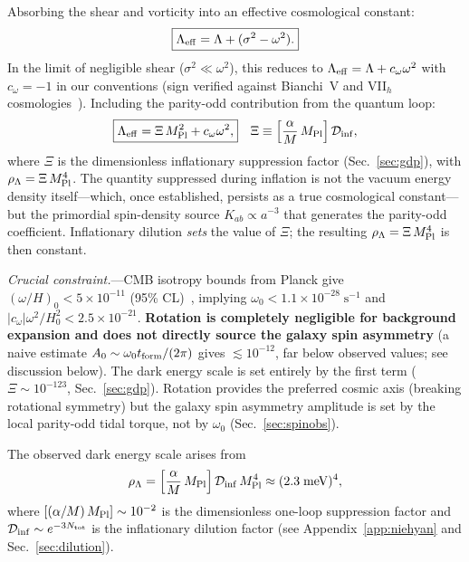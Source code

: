 \documentclass[aps,prd,twocolumn,superscriptaddress,showpacs,preprintnumbers,nofootinbib,longbibliography,floatfix]{revtex4-2}
\newcommand{\Leff}{\Lambda_{\rm eff}}
\newcommand{\Dinf}{\mathcal{D}_{\rm inf}}
\newcommand{\MPl}{M_{\rm Pl}}
\begin{document}
Absorbing the shear and vorticity into an effective cosmological constant:
\begin{equation}\label{eq:Leff}
\boxed{\Leff = \Lambda + (\sigma^2-\omega^2).}
\end{equation}
In the limit of negligible shear ($\sigma^2\ll\omega^2$), this reduces to $\Leff = \Lambda + c_\omega\omega^2$ with $c_\omega=-1$ in our conventions (sign verified against Bianchi~V and VII$_h$ cosmologies~\cite{Saadeh2016}). Including the parity-odd contribution from the quantum loop:
\begin{align}\label{eq:Leff_full}
\boxed{\Leff = \Xi\,\MPl^2 + c_\omega\omega^2,}\quad
\Xi\equiv \left[\frac{\alpha}{M}\,\MPl\right]\Dinf,
\end{align}
where $\Xi$ is the dimensionless inflationary suppression factor (Sec.~\ref{sec:gdp}), with $\rho_\Lambda = \Xi\,\MPl^4$.
The quantity suppressed during inflation is not the vacuum energy density itself---which, once established, persists as a true cosmological constant---but the primordial spin-density source $K_{ab} \propto a^{-3}$ that generates the parity-odd coefficient. Inflationary dilution \textit{sets} the value of $\Xi$; the resulting $\rho_\Lambda = \Xi\,\MPl^4$ is then constant.

\textit{Crucial constraint.}---CMB isotropy bounds from Planck give $(\omega/H)_0 < 5\times 10^{-11}$ (95\% CL)~\cite{Saadeh2016}, implying $\omega_0 < 1.1\times 10^{-28}\;\text{s}^{-1}$ and $|c_\omega|\omega^2/H_0^2 < 2.5\times 10^{-21}$. \textbf{Rotation is completely negligible for background expansion and does not directly source the galaxy spin asymmetry} (a naive estimate $A_0 \sim \omega_0 t_{\rm form}/(2\pi)$ gives $\lesssim 10^{-12}$, far below observed values; see discussion below). The dark energy scale is set entirely by the first term ($\Xi\sim 10^{-123}$, Sec.~\ref{sec:gdp}). Rotation provides the preferred cosmic axis (breaking rotational symmetry) but the galaxy spin asymmetry amplitude is set by the local parity-odd tidal torque, not by $\omega_0$ (Sec.~\ref{sec:spinobs}).

The observed dark energy scale arises from
\begin{equation}\label{eq:Lobs}
\rho_\Lambda = \left[\frac{\alpha}{M}\,\MPl\right]\Dinf\,\MPl^4 \approx (2.3\;\text{meV})^4,
\end{equation}
where $[(\alpha/M)\,\MPl]\sim 10^{-2}$ is the dimensionless one-loop suppression factor and $\Dinf \sim e^{-3N_{\rm tot}}$ is the inflationary dilution factor (see Appendix~\ref{app:niehyan} and Sec.~\ref{sec:dilution}).
\end{document}
